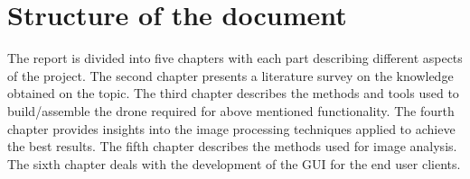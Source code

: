 \section{Structure of the document}
The report is divided into five chapters with each part describing different aspects of the project. The second chapter presents a literature survey on the knowledge obtained on the topic. The third chapter describes the methods and tools used to build/assemble the drone required for above mentioned functionality. The fourth chapter provides insights into the image processing techniques applied to achieve the best results. The fifth chapter describes the methods used for image analysis. The sixth chapter deals with the development of the GUI for the end user clients.


